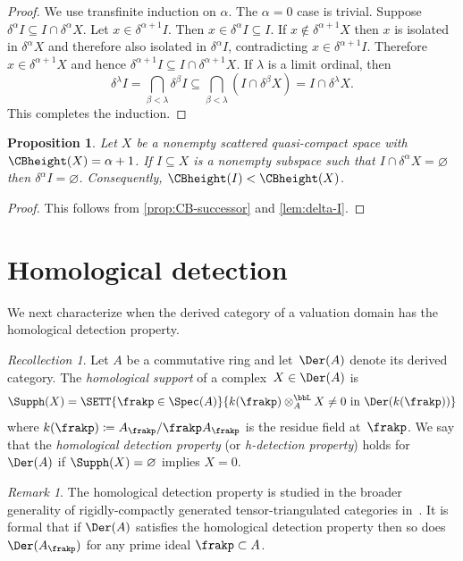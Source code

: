 \documentclass{amsart}
\numberwithin{equation}{section}%
\newtheorem{Prop}[equation]{Proposition}
\theoremstyle{remark}
\newtheorem{Rem}[equation]{Remark}
\newtheorem{Rec}[equation]{Recollection}
\renewcommand{\emptyset}{\varnothing}
\begin{document}
\begin{proof}
    We use transfinite induction on $\alpha$. The $\alpha=0$ case is trivial. Suppose $\delta^\alpha I \subseteq I \cap \delta^\alpha X$. Let $x\in\delta^{\alpha+1}I$. Then $x\in\delta^\alpha I\subseteq I$. If $x\not\in\delta^{\alpha+1}X$ then $x$ is isolated in $\delta^\alpha X$ and therefore also isolated in $\delta^\alpha I$, contradicting $x\in\delta^{\alpha+1}I$. Therefore $x\in\delta^{\alpha+1}X$ and hence $\delta^{\alpha+1}I\subseteq I \cap \delta^{\alpha+1}X$. If $\lambda$ is a limit ordinal, then
    \[
		\delta^\lambda I= \bigcap_{\beta<\lambda}\delta^\beta I \subseteq \bigcap_{\beta<\lambda} (I\cap \delta^\beta X) =I\cap\delta^\lambda X.
    \]
    This completes the induction.
\end{proof}

\begin{Prop}\label{prop:drop-degree}
	Let $X$ be a nonempty scattered quasi-compact space with $\CBheight(X) = \alpha + 1$. If $I \subseteq X$ is a nonempty subspace such that $I \cap \delta^\alpha X = \emptyset$ then $\delta^\alpha I = \emptyset$. Consequently, $\CBheight(I) < \CBheight(X)$.
\end{Prop}

\begin{proof}
    This follows from \cref{prop:CB-successor} and \cref{lem:delta-I}.
\end{proof}

\section{Homological detection}

We next characterize when the derived category of a valuation domain has the homological detection property.

\begin{Rec}\label{rec:h-support}
	Let $A$ be a commutative ring and let~$\Der(A)$ denote its derived category. The \emph{homological support} of a complex~$X \in \Der(A)$ is
	\[
		\Supph(X) = \SETT{\frakp \in \Spec(A)}{k(\frakp) \otimes_A^{\bbL} X \neq 0 \text{ in } \Der(k(\frakp))}
	\]
	where $k(\frakp) \coloneqq A_{\frakp}/\frakp A_{\frakp}$ is the residue field at~$\frakp$. We say that the \emph{homological detection property} (or \emph{h-detection property}) holds for $\Der(A)$ if $\Supph(X) = \emptyset$ implies $X = 0$.
\end{Rec}

\begin{Rem}\label{rem:localization-of-hdp}
	The homological detection property is studied in the broader generality of rigidly-compactly generated tensor-triangulated categories in~\cite{BarthelHeardSandersZou26}. It is formal that if $\Der(A)$ satisfies the homological detection property then so does $\Der(A_{\frakp})$ for any prime ideal $\frakp \subset A$.
\end{Rem}
\end{document}
